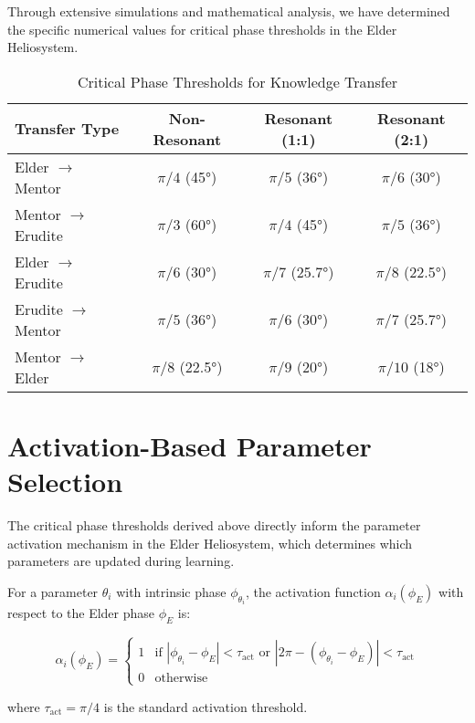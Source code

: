Through extensive simulations and mathematical analysis, we have determined the specific numerical values for critical phase thresholds in the Elder Heliosystem.

\begin{table}[ht]
\centering
\caption{Critical Phase Thresholds for Knowledge Transfer}
\label{tab:phase_thresholds}
\begin{tabular}{|l|c|c|c|}
\hline
\textbf{Transfer Type} & \textbf{Non-Resonant} & \textbf{Resonant (1:1)} & \textbf{Resonant (2:1)} \\
\hline
Elder $\to$ Mentor & $\pi/4$ (45°) & $\pi/5$ (36°) & $\pi/6$ (30°) \\
Mentor $\to$ Erudite & $\pi/3$ (60°) & $\pi/4$ (45°) & $\pi/5$ (36°) \\
Elder $\to$ Erudite & $\pi/6$ (30°) & $\pi/7$ (25.7°) & $\pi/8$ (22.5°) \\
Erudite $\to$ Mentor & $\pi/5$ (36°) & $\pi/6$ (30°) & $\pi/7$ (25.7°) \\
Mentor $\to$ Elder & $\pi/8$ (22.5°) & $\pi/9$ (20°) & $\pi/10$ (18°) \\
\hline
\end{tabular}
\end{table}

\section{Activation-Based Parameter Selection}

The critical phase thresholds derived above directly inform the parameter activation mechanism in the Elder Heliosystem, which determines which parameters are updated during learning.

\begin{definition}
For a parameter $\theta_i$ with intrinsic phase $\phi_{\theta_i}$, the activation function $\alpha_i(\phi_E)$ with respect to the Elder phase $\phi_E$ is:

\begin{equation}
\alpha_i(\phi_E) = 
\begin{cases}
1 & \text{if } |\phi_{\theta_i} - \phi_E| < \tau_{\text{act}} \text{ or } |2\pi - (\phi_{\theta_i} - \phi_E)| < \tau_{\text{act}} \\
0 & \text{otherwise}
\end{cases}
\end{equation}

where $\tau_{\text{act}} = \pi/4$ is the standard activation threshold.
\end{definition}

